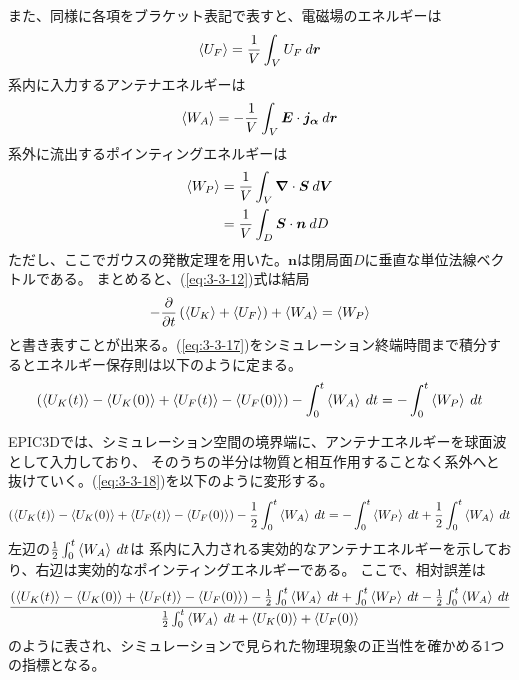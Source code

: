 \documentclass[a4paper,11pt,titlepage]{jsarticle}
\begin{document}
  また、同様に各項をブラケット表記で表すと、電磁場のエネルギーは
  \begin{equation}
    \label{eq:3-3-14}
     \braket{U_F} = \frac{1}{V} \int_V U_F \: d\bm{r}
  \end{equation}
  系内に入力するアンテナエネルギーは
  \begin{equation}
    \label{eq:3-3-15}
     \braket{W_A} = - \frac{1}{V} \int_V \bm{E} \cdot \bm{j_\alpha} \: d\bm{r}
  \end{equation}
  系外に流出するポインティングエネルギーは
  \begin{align}
    \label{eq:3-3-16}
    \nonumber
      \braket{W_P} &= \frac{1}{V} \int_V \bm{\nabla} \cdot \bm{S} \: d\bm{V} \\
      &= \frac{1}{V} \int_D \bm{S} \cdot \bm{n} \: dD
  \end{align}
  ただし、ここでガウスの発散定理を用いた。$\bm{n}$は閉局面$D$に垂直な単位法線ベクトルである。
  まとめると、(\ref{eq:3-3-12})式は結局
  \begin{equation}
    \label{eq:3-3-17}
    - \frac{\partial}{\partial t} \left( \braket{U_K} + \braket{U_F} \right) + \braket{W_A} = \braket{W_P}
  \end{equation}
  と書き表すことが出来る。(\ref{eq:3-3-17})をシミュレーション終端時間まで積分するとエネルギー保存則は以下のように定まる。
  \begin{equation}
    \label{eq:3-3-18}
      \left( \braket{U_K(t)} - \braket{U_K(0)} 
      +  \braket{U_F(t)} - \braket{U_F(0)} \right) - \int_0^t \braket{W_A} \: dt 
      = - \int_0^t \braket{W_P} \: dt
  \end{equation}

  EPIC3Dでは、シミュレーション空間の境界端に、アンテナエネルギーを球面波として入力しており、
  そのうちの半分は物質と相互作用することなく系外へと抜けていく。(\ref{eq:3-3-18})を以下のように変形する。
  \begin{equation}
    \label{eq:3-3-19}
      \left( \braket{U_K(t)} - \braket{U_K(0)} 
      +  \braket{U_F(t)} - \braket{U_F(0)} \right) - \frac{1}{2} \int_0^t \braket{W_A} \: dt 
      = - \int_0^t \braket{W_P} \: dt + \frac{1}{2} \int_0^t \braket{W_A} \: dt
  \end{equation}
  左辺の$\frac{1}{2} \int_0^t \braket{W_A} \: dt$は
  系内に入力される実効的なアンテナエネルギーを示しており、右辺は実効的なポインティングエネルギーである。
ここで、相対誤差は
\begin{equation}
  \label{eq:3-3-20}
    \frac{ \left( \braket{U_K(t)} - \braket{U_K(0)} 
    +  \braket{U_F(t)} - \braket{U_F(0)} \right) - \frac{1}{2} \int_0^t \braket{W_A} \: dt 
    + \int_0^t \braket{W_P} \: dt - \frac{1}{2} \int_0^t \braket{W_A} \: dt }
    { \frac{1}{2} \int_0^t \braket{W_A} \: dt + \braket{U_K(0)} + \braket{U_F(0)} }
\end{equation}
のように表され、シミュレーションで見られた物理現象の正当性を確かめる1つの指標となる。
  \newpage
\end{document}

